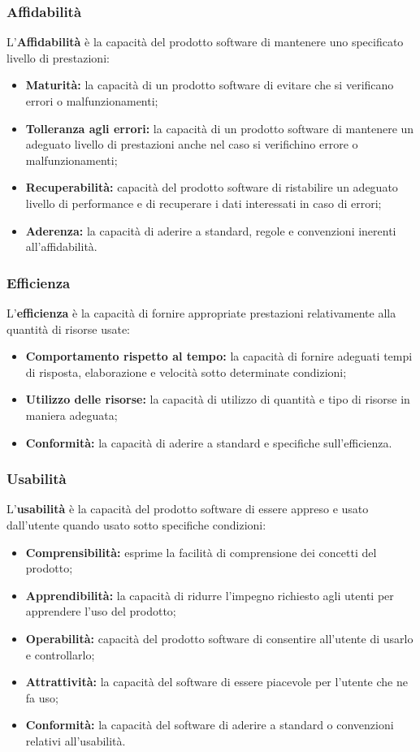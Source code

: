 \begin{flushleft}
\subsubsection{Affidabilità}
L'\textbf{Affidabilità} è la capacità del prodotto software di mantenere uno specificato livello di prestazioni:
\begin{itemize}
	\item \textbf{Maturità:} la capacità di un prodotto software di evitare che si verificano errori o malfunzionamenti;
	\item \textbf{Tolleranza agli errori:} la capacità di un prodotto software di mantenere un adeguato livello di prestazioni anche nel caso si verifichino errore o malfunzionamenti;
	\item \textbf{Recuperabilità:} capacità del prodotto software di ristabilire un adeguato livello di performance e di recuperare i dati interessati in caso di errori;
	\item \textbf{Aderenza:} la capacità di aderire a standard, regole e convenzioni inerenti all'affidabilità.
\end{itemize}

\subsubsection{Efficienza}
L'\textbf{efficienza} è la capacità di fornire appropriate prestazioni relativamente alla quantità di risorse usate:
\begin{itemize}
	\item \textbf{Comportamento rispetto al tempo:} la capacità di fornire adeguati tempi di risposta, elaborazione e velocità sotto determinate condizioni;
	\item \textbf{Utilizzo delle risorse:} la capacità di utilizzo di quantità e tipo di risorse in maniera adeguata;
	\item \textbf{Conformità:} la capacità di aderire a standard e specifiche sull'efficienza.
\end{itemize}

\subsubsection{Usabilità}
L'\textbf{usabilità} è la capacità del prodotto software di essere appreso e usato dall'utente quando usato sotto specifiche condizioni:
\begin{itemize}
	\item \textbf{Comprensibilità:} esprime la facilità di comprensione dei concetti del prodotto;
	\item \textbf{Apprendibilità:} la capacità di ridurre l'impegno richiesto agli utenti per apprendere l'uso del prodotto;
	\item \textbf{Operabilità:} capacità del prodotto software di consentire all'utente di usarlo e controllarlo;
	\item \textbf{Attrattività:} la capacità del software di essere piacevole per l'utente che ne fa uso;
	\item \textbf{Conformità:} la capacità del software di aderire a standard o convenzioni relativi all'usabilità.
\end{itemize}

\end{flushleft}
